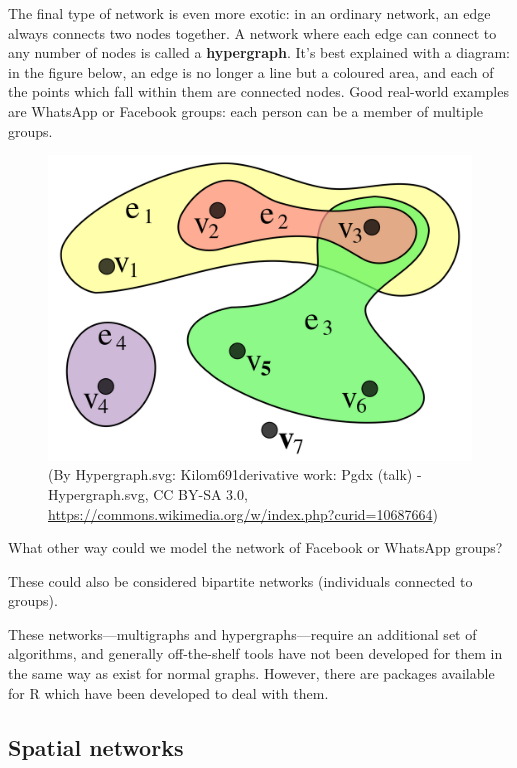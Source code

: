 \documentclass[
]{book}
\begin{document}
The final type of network is even more exotic: in an ordinary network, an edge always connects two nodes together. A network where each edge can connect to any number of nodes is called a \textbf{hypergraph}. It's best explained with a diagram: in the figure below, an edge is no longer a line but a coloured area, and each of the points which fall within them are connected nodes. Good real-world examples are WhatsApp or Facebook groups: each person can be a member of multiple groups.

\begin{figure}
\centering
\includegraphics[width=5.20833in,height=\textheight]{images/1920px-Hypergraph-wikipedia.svg.png}
\caption{(By Hypergraph.svg: Kilom691derivative work: Pgdx (talk) - Hypergraph.svg, CC BY-SA 3.0, \url{https://commons.wikimedia.org/w/index.php?curid=10687664})}
\end{figure}

What other way could we model the network of Facebook or WhatsApp groups?

These could also be considered bipartite networks (individuals connected to groups).

These networks---multigraphs and hypergraphs---require an additional set of algorithms, and generally off-the-shelf tools have not been developed for them in the same way as exist for normal graphs. However, there are packages available for R which have been developed to deal with them.

\hypertarget{spatial-networks}{%
\subsection{Spatial networks}\label{spatial-networks}}
\end{document}
